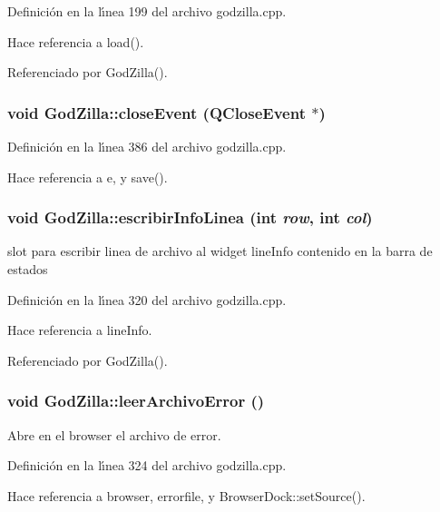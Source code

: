 Definici\'{o}n en la l\'{\i}nea 199 del archivo godzilla.cpp.

Hace referencia a load().

Referenciado por God\-Zilla().
\subsubsection{\setlength{\rightskip}{0pt plus 5cm}void God\-Zilla::close\-Event (QClose\-Event $\ast$)\hspace{0.3cm}{\tt  [protected]}}\label{classGodZilla_b0}




Definici\'{o}n en la l\'{\i}nea 386 del archivo godzilla.cpp.

Hace referencia a e, y save().
\subsubsection{\setlength{\rightskip}{0pt plus 5cm}void God\-Zilla::escribir\-Info\-Linea (int {\em row}, int {\em col})\hspace{0.3cm}{\tt  [private, slot]}}\label{classGodZilla_k0}


slot para escribir linea de archivo al widget line\-Info contenido en la barra de estados 



Definici\'{o}n en la l\'{\i}nea 320 del archivo godzilla.cpp.

Hace referencia a line\-Info.

Referenciado por God\-Zilla().
\subsubsection{\setlength{\rightskip}{0pt plus 5cm}void God\-Zilla::leer\-Archivo\-Error ()\hspace{0.3cm}{\tt  [private, slot]}}\label{classGodZilla_k1}


Abre en el browser el archivo de error. 



Definici\'{o}n en la l\'{\i}nea 324 del archivo godzilla.cpp.

Hace referencia a browser, errorfile, y Browser\-Dock::set\-Source().

